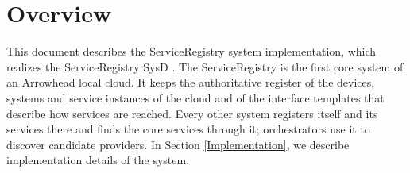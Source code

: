 \documentclass[a4paper]{arrowhead}
\begin{document}
\sloppy

\ArrowheadSetup

\begin{center}
  \vspace*{1cm}
  \huge{\arrowtitle}

  \vspace*{0.2cm}
  \LARGE{\arrowtype}
  \vspace*{1cm}

  \vspace*{\fill}


  \vspace*{1cm}
  \vspace*{\fill}

  \begin{abstract}
    This document describes the design and implementation of the ServiceRegistry core system of Arrowhead 5.2.2 in Java Spring (\texttt{ah5-core-java-spring/serviceregistry}).
  \end{abstract}

  \vspace*{1cm}
\end{center}

\newpage

\tableofcontents
\newpage

\section{Overview}
\label{sec:overview}

This document describes the ServiceRegistry system implementation, which realizes the ServiceRegistry SysD \cite{sr-sysd}. The ServiceRegistry is the first core system of an Arrowhead local cloud. It keeps the authoritative register of the devices, systems and service instances of the cloud and of the interface templates that describe how services are reached. Every other system registers itself and its services there and finds the core services through it; orchestrators use it to discover candidate providers.
In Section \ref{Implementation}, we describe implementation details of the system.
\end{document}
